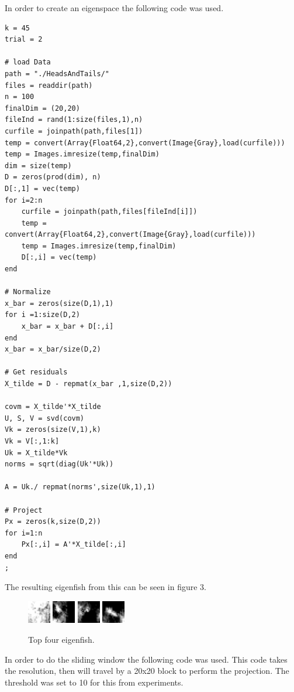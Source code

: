 \documentclass[11pt]{article} %
\begin{document}
In order to create an eigenspace the following code was used.
\begin{lstlisting}
k = 45
trial = 2

# load Data
path = "./HeadsAndTails/"
files = readdir(path)
n = 100
finalDim = (20,20)
fileInd = rand(1:size(files,1),n)
curfile = joinpath(path,files[1])
temp = convert(Array{Float64,2},convert(Image{Gray},load(curfile)))
temp = Images.imresize(temp,finalDim)
dim = size(temp)
D = zeros(prod(dim), n)
D[:,1] = vec(temp)
for i=2:n
    curfile = joinpath(path,files[fileInd[i]])
    temp = convert(Array{Float64,2},convert(Image{Gray},load(curfile)))
    temp = Images.imresize(temp,finalDim)
    D[:,i] = vec(temp)
end

# Normalize
x_bar = zeros(size(D,1),1)
for i =1:size(D,2)
    x_bar = x_bar + D[:,i]
end
x_bar = x_bar/size(D,2)

# Get residuals
X_tilde = D - repmat(x_bar ,1,size(D,2))

covm = X_tilde'*X_tilde
U, S, V = svd(covm)
Vk = zeros(size(V,1),k)
Vk = V[:,1:k]
Uk = X_tilde*Vk
norms = sqrt(diag(Uk'*Uk))

A = Uk./ repmat(norms',size(Uk,1),1)

# Project
Px = zeros(k,size(D,2))
for i=1:n
    Px[:,i] = A'*X_tilde[:,i]
end
;
\end{lstlisting}

The resulting eigenfish from this can be seen in figure 3.
\begin{figure}[h]
\includegraphics[width=1cm,keepaspectratio]{Images/eigfish1.png}
\includegraphics[width=1cm,keepaspectratio]{Images/eigfish2.png}
\includegraphics[width=1cm,keepaspectratio]{Images/eigfish3.png}
\includegraphics[width=1cm,keepaspectratio]{Images/eigfish4.png}
\caption{Top four eigenfish.}
\end{figure}

In order to do the sliding window the following code was used. This code takes the resolution, then
will travel by a 20x20 block to perform the projection. The threshold was set to 10 for this from experiments.
\end{document}
